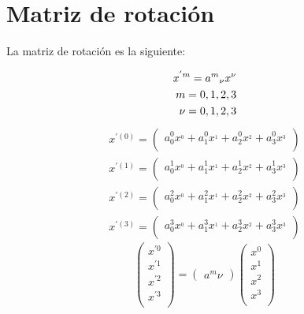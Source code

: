 \section{Matriz de rotaci\'on}
La matriz de rotación es la siguiente:


	\begin{eqnarray*}
		x^{'m} = a^{m}\hfill_{\nu} x^{\nu}\\
		m = 0,1,2,3\\
		\nu = 0,1,2,3
	\end{eqnarray*}		
	\begin{eqnarray*}
		x^{'(0)} =
		\left( {\begin{array}{cc}
				a^{0} _0 x^{_0} + a^{0} _1 x^{_1} + a^{0} _2 x^{_2} + a^{0} _3 x^{_3}\\
		\end{array} } \right)\\
	x^{'(1)} =
	\left( {\begin{array}{cc}
			a^{1} _0 x^{_0} + a^{1} _1 x^{_1} + a^{1} _2 x^{_2} + a^{1} _3 x^{_3}\\
	\end{array} } \right)\\
	x^{'(2)} =
	\left( {\begin{array}{cc}
			a^{2} _0 x^{_0} + a^{2} _1 x^{_1} + a^{2} _2 x^{_2} + a^{2} _3 x^{_3}\\
	\end{array} } \right)\\
	x^{'(3)} =
	\left( {\begin{array}{cc}
			a^{3} _0 x^{_0} + a^{3} _1 x^{_1} + a^{3} _2 x^{_2} + a^{3} _3 x^{_3}\\
	\end{array} } \right)
	\end{eqnarray*}
\begin{equation*}
	\left(
	\begin{array}{ccc}
		x^{'0}\\
		x^{'1}\\
		x^{'2}\\
		x^{'3}\\ 
	\end{array}
	\right)
	=
	\left(
	\begin{array}{c}
		a^{m}\nu
	\end{array}
	\right)
	{}
	\left(
	\begin{array}{ccc}
		x^{0}\\
		x^{1}\\
		x^{2}\\
		x^{3}\\ 
	\end{array}
	\right)
\end{equation*}		
